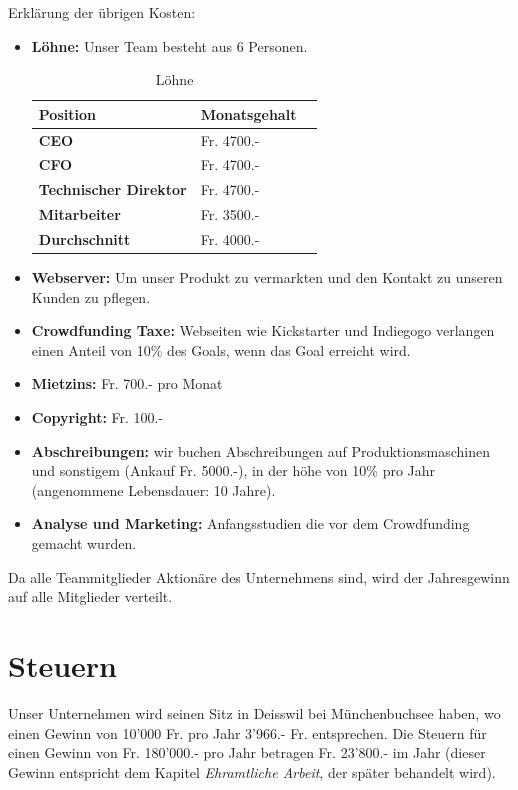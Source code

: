 Erkl\"arung der \"ubrigen Kosten:\\
\begin{itemize}
\item \textbf{L\"ohne:} Unser Team besteht aus 6 Personen. \\
\begin{table}[H]
\centering
\caption{L\"ohne}
\label{L\"ohne}
\begin{tabular}{lll}
\textbf{Position} & \textbf{Monatsgehalt}  \\ \hline
  \textbf{CEO} &  Fr. 4700.- \\ \hline
 \textbf{CFO} &  Fr. 4700.- \\ \hline
 \textbf{Technischer Direktor}& Fr. 4700.-  \\ \hline
 \textbf{Mitarbeiter} &Fr.  3500.- \\ \hline
 \textbf{Durchschnitt} & Fr. 4000.-\\ \hline
\end{tabular}
\end{table}
\item \textbf{Webserver:} Um unser Produkt zu vermarkten und den Kontakt zu unseren Kunden zu pflegen.

\item \textbf{Crowdfunding Taxe:} Webseiten wie Kickstarter und Indiegogo verlangen einen Anteil von 10\% des Goals, wenn das Goal erreicht wird.
\item \textbf{Mietzins:} Fr. 700.- pro Monat
\item \textbf{Copyright:} Fr. 100.-
\item \textbf{Abschreibungen:} wir buchen Abschreibungen auf Produktionsmaschinen und sonstigem (Ankauf Fr. 5000.-), in der h\"ohe von 10\% pro Jahr (angenommene Lebensdauer: 10 Jahre).
\item \textbf{Analyse und Marketing:} Anfangsstudien die vor dem Crowdfunding gemacht wurden.
\end{itemize}
Da alle Teammitglieder Aktion\"are des Unternehmens sind, wird der Jahresgewinn auf alle Mitglieder verteilt.
\section{Steuern}
Unser Unternehmen wird seinen Sitz in Deisswil bei M\"unchenbuchsee haben, wo einen Gewinn von 10'000 Fr. pro Jahr  3'966.- Fr. entsprechen. Die Steuern f\"ur einen Gewinn von Fr. 180'000.- pro Jahr betragen Fr. 23'800.- im Jahr (dieser Gewinn entspricht dem Kapitel \textit{Ehramtliche Arbeit}, der später behandelt wird).
